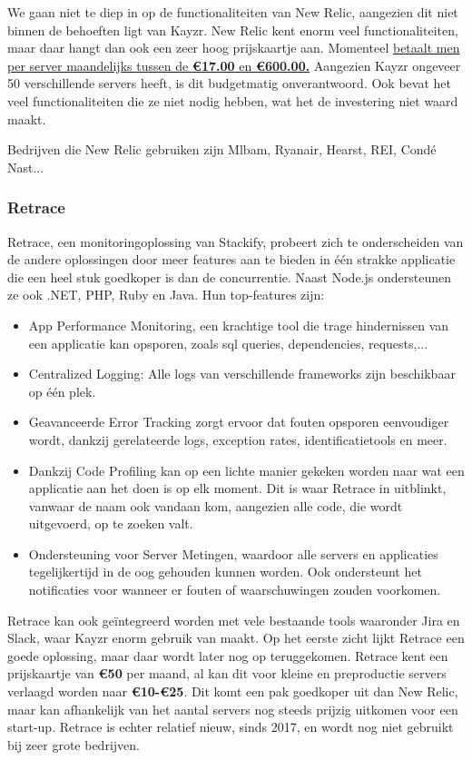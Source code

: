 We gaan niet te diep in op de functionaliteiten van New Relic, aangezien dit niet binnen de behoeften ligt van Kayzr. New Relic kent enorm veel functionaliteiten, maar daar hangt dan ook een zeer hoog prijskaartje aan. Momenteel \href{https://newrelic.com/products/browser-monitoring/pricing}{betaalt men per server maandelijks tussen de \textbf{\euro17.00} en \textbf{\euro600.00.}}  Aangezien Kayzr ongeveer 50 verschillende servers heeft, is dit budgetmatig onverantwoord. Ook bevat het veel functionaliteiten die ze niet nodig hebben, wat het de investering niet waard maakt.

Bedrijven die New Relic gebruiken zijn Mlbam, Ryanair, Hearst, REI, Condé Nast...

\subsubsection{Retrace}
\label{sec:retrace}

Retrace, een monitoringoplossing van Stackify, probeert zich te onderscheiden van de andere oplossingen door meer features aan te bieden in één strakke applicatie die een heel stuk goedkoper is dan de concurrentie. Naast Node.js ondersteunen ze ook .NET, PHP, Ruby en Java. Hun top-features zijn:

\begin{itemize}
	\item App Performance Monitoring, een krachtige tool die trage hindernissen van een applicatie kan opsporen, zoals sql queries, dependencies, requests,...
	\item Centralized Logging: Alle logs van verschillende frameworks zijn beschikbaar op één plek.
	\item Geavanceerde Error Tracking zorgt ervoor dat fouten opsporen eenvoudiger wordt, dankzij gerelateerde logs, exception rates, identificatietools en meer.
	\item Dankzij Code Profiling kan op een lichte manier gekeken worden naar wat een applicatie aan het doen is op elk moment. Dit is waar Retrace in uitblinkt, vanwaar de naam ook vandaan kom, aangezien alle code, die wordt uitgevoerd, op te zoeken valt.
	\item Ondersteuning voor Server Metingen, waardoor alle servers en applicaties tegelijkertijd in de oog gehouden kunnen worden. Ook ondersteunt het notificaties voor wanneer er fouten of waarschuwingen zouden voorkomen.
\end{itemize}

Retrace kan ook geïntegreerd worden met vele bestaande tools waaronder Jira en Slack, waar Kayzr enorm gebruik van maakt. Op het eerste zicht lijkt Retrace een goede oplossing, maar daar wordt later nog op teruggekomen. Retrace kent een prijskaartje van \textbf{\euro50} per maand, al kan dit voor kleine en preproductie servers verlaagd worden naar \textbf{\euro10-\euro25}. Dit komt een pak goedkoper uit dan New Relic, maar kan afhankelijk van het aantal servers nog steeds prijzig uitkomen voor een start-up. Retrace is echter relatief nieuw, sinds 2017, en wordt nog niet gebruikt bij zeer grote bedrijven.

